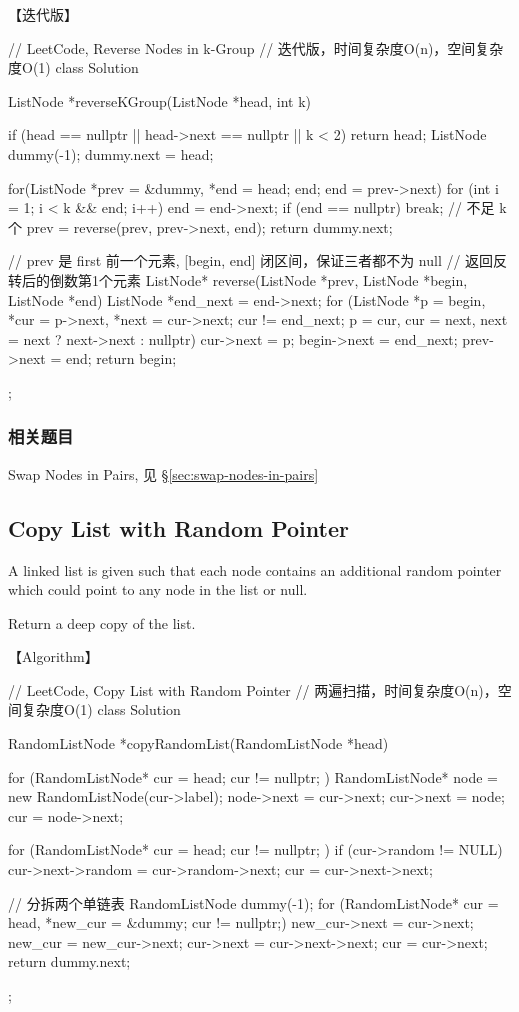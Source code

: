 【迭代版】
\begin{Code}
	// LeetCode, Reverse Nodes in k-Group
	// 迭代版，时间复杂度O(n)，空间复杂度O(1)
	class Solution {
		ListNode *reverseKGroup(ListNode *head, int k) {
			if (head == nullptr || head->next == nullptr || k < 2) return head;
			ListNode dummy(-1);
			dummy.next = head;
			
			for(ListNode *prev = &dummy, *end = head; end; end = prev->next) {
				for (int i = 1; i < k && end; i++)
					end = end->next;
				if (end  == nullptr) break;  // 不足 k 个
				prev = reverse(prev, prev->next, end);
			}
			return dummy.next;
		}
		
		// prev 是 first 前一个元素, [begin, end] 闭区间，保证三者都不为 null
		// 返回反转后的倒数第1个元素
		ListNode* reverse(ListNode *prev, ListNode *begin, ListNode *end) {
			ListNode *end_next = end->next;
			for (ListNode *p = begin, *cur = p->next, *next = cur->next; cur != end_next;
				p = cur, cur = next, next = next ? next->next : nullptr) {
				cur->next = p;
			}
			begin->next = end_next;
			prev->next = end;
			return begin;
		}
	};
\end{Code}


\subsubsection{相关题目}
\begindot
\item Swap Nodes in Pairs, 见 \S \ref{sec:swap-nodes-in-pairs}
\myenddot


\subsection{Copy List with Random Pointer}
\label{sec:copy-list-with-random-pointer}



A linked list is given such that each node contains an additional random
pointer which could point to any node in the list or null.

Return a deep copy of the list.


【Algorithm】
\begin{Code}
	// LeetCode, Copy List with Random Pointer
	// 两遍扫描，时间复杂度O(n)，空间复杂度O(1)
	class Solution {
		RandomListNode *copyRandomList(RandomListNode *head) {
			for (RandomListNode* cur = head; cur != nullptr; ) {
				RandomListNode* node = new RandomListNode(cur->label);
				node->next = cur->next;
				cur->next = node;
				cur = node->next;
			}
			
			for (RandomListNode* cur = head; cur != nullptr; ) {
				if (cur->random != NULL)
					cur->next->random = cur->random->next;
				cur = cur->next->next;
			}
			
			// 分拆两个单链表
			RandomListNode dummy(-1);
			for (RandomListNode* cur = head, *new_cur = &dummy; cur != nullptr;) {
				new_cur->next = cur->next;
				new_cur = new_cur->next;
				cur->next = cur->next->next;
				cur = cur->next;
			}
			return dummy.next;
		}
	};
\end{Code}


